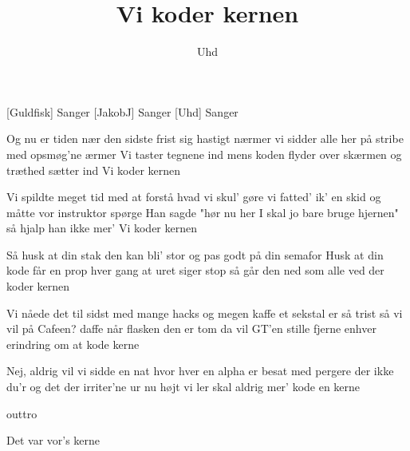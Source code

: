 \documentclass[a4paper,11pt]{article}
\title{Vi koder kernen}
\author{Uhd}
\begin{document}
\maketitle

\begin{roles}
[Guldfisk] Sanger
[JakobJ] Sanger
[Uhd] Sanger
\end{roles}

\begin{props}
\end{props}

\begin{song}

Og nu er tiden nær
den sidste frist sig hastigt nærmer
vi sidder alle her
på stribe med opsmøg'ne ærmer
Vi taster tegnene ind
mens koden flyder over skærmen
og træthed sætter ind
Vi koder kernen

Vi spildte meget tid
med at forstå hvad vi skul' gøre
vi fatted' ik' en skid
og måtte vor instruktor spørge
Han sagde "hør nu her
I skal jo bare bruge hjernen"
så hjalp han ikke mer'
Vi koder kernen

Så husk at din stak
den kan bli' stor
og pas godt på
din semafor
Husk at din kode får en prop
hver gang at uret siger stop
så går den ned
som alle ved
der koder kernen

Vi nåede det til sidst
med mange hacks og megen kaffe
et sekstal er så trist
så vi vil på Cafeen? daffe
når flasken den er tom
da vil GT'en stille fjerne
enhver erindring om
at kode kerne

Nej, aldrig vil vi
sidde en nat
hvor hver en alpha
er besat
med pergere der ikke du'r
og det der irriter'ne ur
nu højt vi ler
skal aldrig mer'
kode en kerne

\scene outtro

Det var vor's kerne

\end{song}
\end{document}
